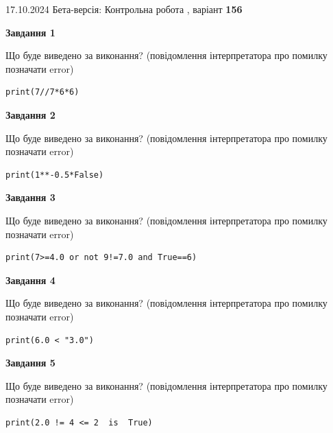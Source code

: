 \documentclass[12pt, ukrainian]{article}
\begin{document}
{\Large{17.10.2024 Бета-версія: Контрольна робота , варіант  \No \textbf { 156 }\par}}
{
\begin {large}
{\begin {center}\textbf{Завдання 1}\end {center}}

Що буде виведено за виконання? (повідомлення інтерпретатора про помилку позначати error)\par
\begin{verbatim}
print(7//7*6*6)
\end{verbatim}

{\begin {center}\textbf{Завдання 2}\end {center}}

Що буде виведено за виконання? (повідомлення інтерпретатора про помилку позначати error)\par
\begin{verbatim}
print(1**-0.5*False)
\end{verbatim}

{\begin {center}\textbf{Завдання 3}\end {center}}

Що буде виведено за виконання? (повідомлення інтерпретатора про помилку позначати error)\par
\begin{verbatim}
print(7>=4.0 or not 9!=7.0 and True==6)
\end{verbatim}

{\begin {center}\textbf{Завдання 4}\end {center}}

Що буде виведено за виконання? (повідомлення інтерпретатора про помилку позначати error)\par
\begin{verbatim}
print(6.0 < "3.0")
\end{verbatim}

{\begin {center}\textbf{Завдання 5}\end {center}}

Що буде виведено за виконання? (повідомлення інтерпретатора про помилку позначати error)\par
\begin{verbatim}
print(2.0 != 4 <= 2  is  True)
\end{verbatim}


\end{large}}
\end{document}

